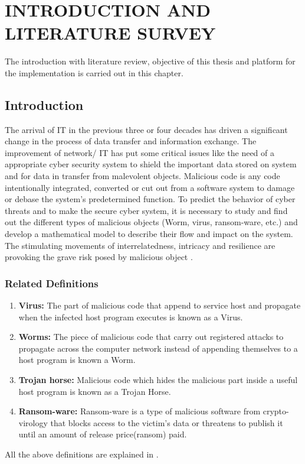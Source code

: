 
\chapter{INTRODUCTION AND LITERATURE SURVEY}
The introduction with literature review, objective of this thesis and platform for the implementation is carried out in this chapter.
\section{Introduction}
The arrival of IT in the previous three or four decades has driven a significant
 change in the process of data transfer and information exchange. The improvement
  of network/ IT has put some critical issues like the need of a appropriate cyber security system
to shield the important data stored on system and for data in transfer
 from malevolent objects. Malicious code is any code intentionally integrated,
converted or cut out from a software system to damage or debase
 the system's predetermined function. To predict the behavior of cyber threats and to make the secure cyber system,
 it is necessary to study and find out the different types of malicious objects
 (Worm, virus, ransom-ware, etc.) and develop a mathematical
 model to describe their flow and impact on the system. The stimulating movements of interrelatedness,
  intricacy and resilience are provoking the grave risk posed by malicious object \cite{edtr15,edtr1,edtr3,edtr2}.

\subsection{Related Definitions}
\begin{enumerate}
  \item {\bf Virus:} The part of malicious code that append to service host and propagate when the infected host program executes is known as a Virus.
  \item {\bf Worms:} The piece of malicious code that carry out registered attacks to propagate across the computer network instead of appending themselves to a host program is known a Worm.
  \item {\bf Trojan horse:} Malicious code which hides the malicious part inside a useful host program is known as a Trojan Horse.
  \item {\bf Ransom-ware:} Ransom-ware is a type of malicious software from crypto-virology that blocks
 access to the victim's data or threatens to publish it until an amount of release price(ransom) paid.
\end{enumerate}
All the above definitions are explained in \cite{edtr1}.
